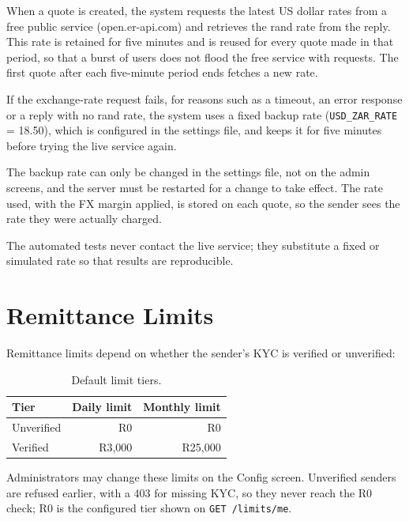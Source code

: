 \documentclass[11pt,a4paper]{article}
\newcommand{\code}[1]{\texttt{\small #1}}
\begin{document}
When a quote is created, the system requests the latest US dollar rates from a free public service (open.er-api.com) and retrieves the rand rate from the reply. This rate is retained for five minutes and is reused for every quote made in that period, so that a burst of users does not flood the free service with requests. The first quote after each five-minute period ends fetches a new rate.

If the exchange-rate request fails, for reasons such as a timeout, an error response or a reply with no rand rate, the system uses a fixed backup rate (\code{USD\_ZAR\_RATE} = 18.50), which is configured in the settings file, and keeps it for five minutes before trying the live service again.

The backup rate can only be changed in the settings file, not on the admin screens, and the server must be restarted for a change to take effect. The rate used, with the FX margin applied, is stored on each quote, so the sender sees the rate they were actually charged.

The automated tests never contact the live service; they substitute a fixed or simulated rate so that results are reproducible.

\section{Remittance Limits}\label{sec:limits}

Remittance limits depend on whether the sender's KYC is verified or unverified:

\begin{table}[H]
\centering\small
{}
\begin{tabular}{@{}lrr@{}}
\toprule
\rowcolor{headbg}\textbf{Tier} & \textbf{Daily limit} & \textbf{Monthly limit} \\
\midrule
Unverified & R0     & R0 \\
Verified   & R3,000 & R25,000 \\
\bottomrule
\end{tabular}
\caption{Default limit tiers.}
\label{tab:tiers}
\end{table}

Administrators may change these limits on the Config screen. Unverified senders are refused earlier, with a 403 for missing KYC, so they never reach the R0 check; R0 is the configured tier shown on \code{GET /limits/me}.
\end{document}
